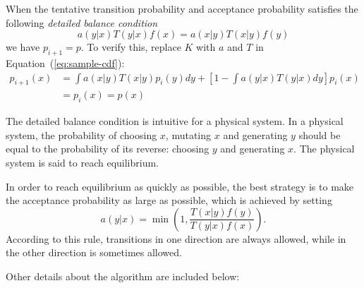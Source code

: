 \documentclass{article}
\begin{document}
When the tentative transition probability and acceptance probability satisfies the following \emph{detailed balance condition}
\[
    a(y|x)T(y|x)f(x) = a(x|y)T(x|y)f(y)
\]
we have $p_{i + 1} = p$. To verify this, replace $K$ with $a$ and $T$ in Equation~(\ref{eq:sample-cdf}):
\begin{align*}
    p_{i + 1}(x) &= \int a(x|y)T(x|y)p_i(y)dy + \left[1 - \int a(y|x)T(y|x)dy\right]p_i(x)\\
    &= p_i(x) = p(x)
\end{align*}

The detailed balance condition is intuitive for a physical system. In a physical system, the probability of choosing $x$, mutating $x$ and generating $y$ should be equal to the probability of its reverse: choosing $y$ and generating $x$. The physical system is said to reach equilibrium.

In order to reach equilibrium as quickly as possible, the best strategy is to make the acceptance probability as large as possible, which is achieved by setting
\[
    a(y|x) = \min\left(1, \frac{T(x|y)f(y)}{T(y|x)f(x)}\right).
\]
According to this rule, transitions in one direction are always allowed, while in the other direction is sometimes allowed.

Other details about the algorithm are included below:
\end{document}

